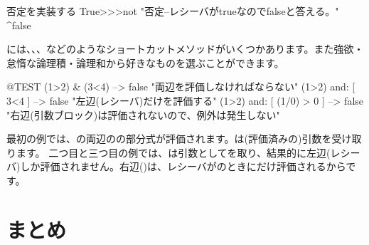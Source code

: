 \documentclass[a4paper,10pt,twoside]{book}
\begin{document}
\begin{method}{否定を実装する}
True>>>not
    "否定--レシーバがtrueなのでfalseと答える。"
    ^false
\end{method}

には、、、などのようなショートカットメソッドがいくつかあります。また強欲・怠惰な論理積・論理和から好きなものを選ぶことができます。

\begin{code}{@TEST}
(1>2) & (3<4)              --> false    "両辺を評価しなければならない"
(1>2) and: [ 3<4 ]        --> false    "左辺(レシーバ)だけを評価する"
(1>2) and: [ (1/0) > 0 ] --> false    "右辺(引数ブロック)は評価されないので、例外は発生しない"
\end{code}

最初の例では、の両辺のの部分式が評価されます。\ct{&}は(評価済みの)引数を受け取ります。
二つ目と三つ目の例では、は引数としてを取り、結果的に左辺(レシーバ)しか評価されません。右辺()は、レシーバがのときにだけ評価されるからです。


\section{まとめ}
\end{document}

